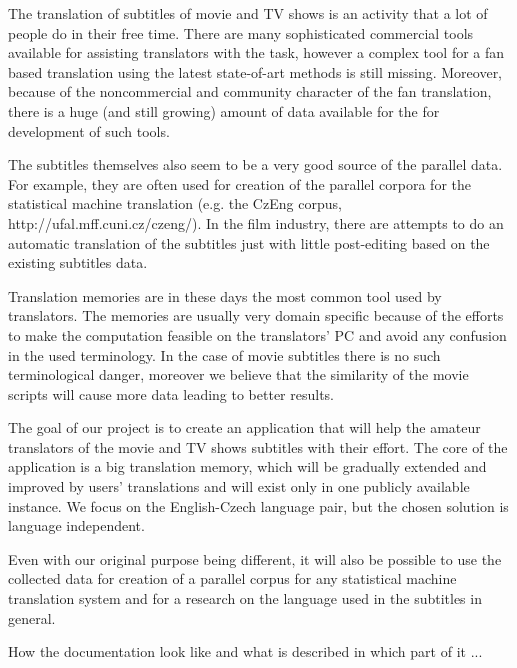
The translation of subtitles of movie and TV shows is an activity that  a lot of people do in their free time.
There are many sophisticated commercial tools available for assisting translators with the task, however a complex tool for a fan based translation using the latest state-of-art methods is still missing. 
Moreover, because of the noncommercial and community character of the fan translation, there is a huge (and still growing) amount of data available for the for development of such tools.

The subtitles themselves also seem to be a very good source of the parallel data. 
For example, they are often used for creation of the parallel corpora for the statistical machine translation (e.g. the CzEng corpus, http://ufal.mff.cuni.cz/czeng/).
In the film industry, there are attempts to do an automatic translation of the subtitles just with little post-editing based on the existing subtitles data.

Translation memories are in these days the most common tool used by translators.
The memories are usually very domain specific because of the efforts to make the computation feasible on the translators' PC and avoid any confusion in the used terminology. 
In the case of movie subtitles there is no such terminological danger, moreover we believe that the similarity of the movie scripts will cause more data  leading to better results.

The goal of our project is to create an application that will help the amateur translators of the movie and TV shows subtitles with their effort.
The core of the application is a big translation memory, which will be gradually extended and improved by users' translations and will exist only in one publicly available instance. We focus on the English-Czech language pair, but the chosen solution is language independent. 

Even with our original purpose being different, it will also be possible to use the collected data for creation of a parallel corpus for any statistical machine translation system and for a research on the language used in the subtitles in general.

How the documentation look like and what is described in which part of it ... 